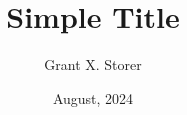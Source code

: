 \documentclass{beamer}
\title{Simple Title}
\author{Grant X. Storer}
\institute{Inter-American Development Bank}
\date{August, 2024}
\begin{document}
    \frame{\titlepage}
\end{document}
